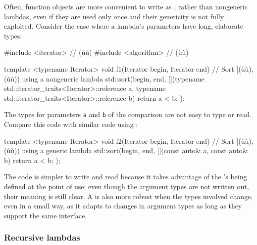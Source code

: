 {Often, function objects are more convenient to write as , rather than nongeneric lambdas, even if they are used only
once and their genericity is not fully exploited. Consider the case
where a lambda's parameters have long, elaborate types:

\begin{emcppslisting}[emcppsbatch=e5,emcppsstandards={c++14}]
#include <iterator>   // (ù{}ù)
#include <algorithm>  // (ù{}ù)

template <typename Iterator>
void f1(Iterator begin, Iterator end)
    // Sort [(ù{}ù), (ù{}ù)) using a nongeneric lambda
{
    std::sort(begin, end,
              [](typename std::iterator_traits<Iterator>::reference a,
                 typename std::iterator_traits<Iterator>::reference b)
              {
                  return a < b;
              });
}
\end{emcppslisting}
    

\noindent The types for parameters \lstinline!a! and \lstinline!b! of the comparison
 are not easy to type or read. Compare this
code with similar code using :

\begin{emcppslisting}[emcppsbatch=e5]
template <typename Iterator>
void f2(Iterator begin, Iterator end)
    // Sort [(ù{}ù), (ù{}ù)) using a generic lambda
{
    std::sort(begin, end,
              [](const auto& a, const auto& b) { return a < b; });
}
\end{emcppslisting}
    

\noindent The code is simpler to write and read because it takes advantage of the
's being defined at the point of use; even
though the argument types are not written out, their meaning is still
clear. A  is also more robust when the types
involved change, even in a small way, as it adapts to changes in
argument types as long as they support the same interface.

\subsubsection[Recursive lambdas]{Recursive lambdas}\label{recursive-lambdas}

}
